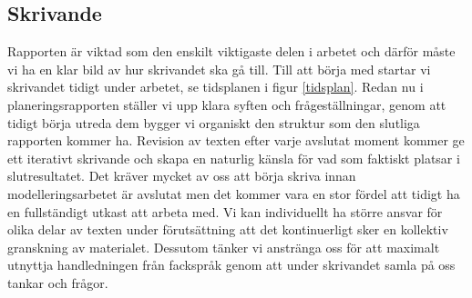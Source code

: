 \subsection{Skrivande}
Rapporten är viktad som den enskilt viktigaste delen i arbetet och därför måste vi ha en klar bild av hur skrivandet ska gå till. Till att börja med startar vi skrivandet tidigt under arbetet, se tidsplanen i figur \ref{tidsplan}. Redan nu i planeringsrapporten ställer vi upp klara syften och frågeställningar, genom att tidigt börja utreda dem bygger vi organiskt den struktur som den slutliga rapporten kommer ha. Revision av texten efter varje avslutat moment kommer ge ett iterativt skrivande och skapa en naturlig känsla för vad som faktiskt platsar i slutresultatet. 
Det kräver mycket av oss att börja skriva innan modelleringsarbetet är avslutat men det kommer vara en stor fördel att tidigt ha en fullständigt utkast att arbeta med. Vi kan individuellt ha större ansvar för olika delar av texten under förutsättning att det kontinuerligt sker en kollektiv granskning av materialet. Dessutom tänker vi anstränga oss för att maximalt utnyttja handledningen från fackspråk genom att under skrivandet samla på oss tankar och frågor.


